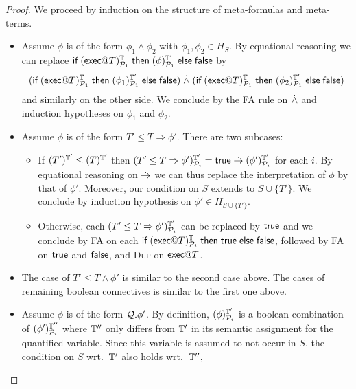 \begin{proof}
  We proceed by induction on the structure of meta-formulas and meta-terms.
  \begin{itemize}
    \item Assume $\phi$ is of the form $\phi_1\wedge\phi_2$ with
      $\phi_1,\phi_2\in H_S$. By equational reasoning we can replace
      $\textsf{if}\; (\textsf{exec} @ T)^{\mathbb{T}}_{\mathcal{P}_1}
      \;\textsf{then}\; (\phi)^{\mathbb{T}'}_{\mathcal{P}_1} \;\textsf{else}\; \textsf{false}$
      by
      $$
      (\textsf{if}\; (\textsf{exec} @ T)^{\mathbb{T}}_{\mathcal{P}_1}
       \;\textsf{then}\; (\phi_1)^{\mathbb{T}'}_{\mathcal{P}_1} \;\textsf{else}\; \textsf{false})
      \stackrel{.}{\wedge}
      (\textsf{if}\; (\textsf{exec} @ T)^{\mathbb{T}}_{\mathcal{P}_1}
       \;\textsf{then}\; (\phi_2)^{\mathbb{T}'}_{\mathcal{P}_1} \;\textsf{else}\; \textsf{false})$$
     and similarly on the other side.
     We conclude by the \textsc{FA} rule on $\stackrel{.}{\wedge}$ and induction
     hypotheses on $\phi_1$ and $\phi_2$.
   \item Assume $\phi$ is of the form $T' \leq T \Rightarrow \phi'$.
     There are two subcases:
     \begin{itemize}
       \item If $(T')^{\mathbb{T}'}_{} \leq (T)^{\mathbb{T}'}_{}$ then
         $(T' \leq T \Rightarrow \phi')^{\mathbb{T}'}_{\mathcal{P}_i} =
         \textsf{true} \stackrel{.}{\rightarrow} (\phi')^{\mathbb{T}'}_{\mathcal{P}_i}$ for each $i$.
         By equational reasoning on $\stackrel{.}{\rightarrow}$ we can thus replace
         the interpretation of $\phi$ by that of $\phi'$.
         Moreover, our condition on $S$ extends to $S \cup \{T'\}$.
         We conclude by induction hypothesis on
         $\phi' \in H_{S\cup\{T'\}}$.
       \item Otherwise, each
         $(T' \leq T \Rightarrow \phi')^{\mathbb{T}'}_{\mathcal{P}_i}$ can be
         replaced by $\textsf{true}$ and we conclude by \textsc{FA}
         on each $\textsf{if}\; (\textsf{exec} @ T)^{\mathbb{T}}_{\mathcal{P}_i} \;\textsf{then}\; \textsf{true}
         \;\textsf{else}\; \textsf{false}$, followed
         by \textsc{FA} on $\textsf{true}$ and $\textsf{false}$,
         and \textsc{Dup} on $\textsf{exec} @ T$.
     \end{itemize}
   \item
     The case of $T' \leq T \wedge \phi'$ is similar to the
     second case above.
     The cases of remaining boolean connectives is similar to the
     first one above.
   \item Assume $\phi$ is of the form ${\cal Q}.\phi'$.
     By definition, $(\phi)^{\mathbb{T}'}_{\mathcal{P}_i}$
     is a boolean combination
     of $(\phi')^{\mathbb{T}''}_{\mathcal{P}_i}$
     where $\mathbb{T}''$ only differs from $\mathbb{T}'$ in its semantic assignment
     for the quantified variable.
     Since this variable is assumed to not occur in $S$,
     the condition on $S$ wrt.\ $\mathbb{T}'$ also holds wrt.\ $\mathbb{T}''$,

\end{itemize}
\end{proof}
